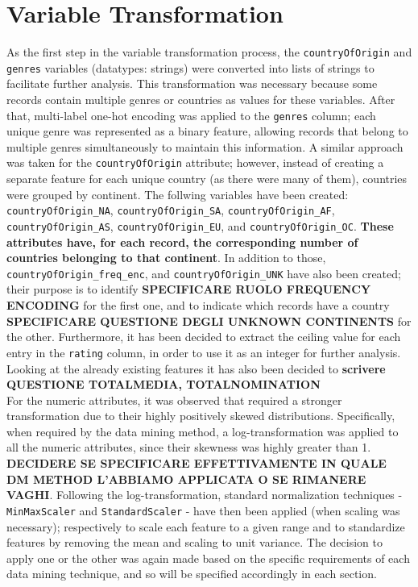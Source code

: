 \section{Variable Transformation}\label{sec:var_Transformation}
As the first step in the variable transformation process, the \texttt{countryOfOrigin} and \texttt{genres} variables (datatypes: strings) were converted into lists of strings to facilitate further analysis. 
This transformation was necessary because some records contain multiple genres or countries as values for these variables.
After that, multi-label one-hot encoding was applied to the \texttt{genres} column; each unique genre was represented as a binary feature, allowing records that belong to multiple genres simultaneously to maintain this information.
A similar approach was taken for the \texttt{countryOfOrigin} attribute; however, instead of creating a separate feature for each unique country (as there were many of them), countries were grouped by continent.
The follwing variables have been created: \texttt{countryOfOrigin\_NA}, \texttt{countryOfOrigin\_SA}, \texttt{countryOfOrigin\_AF}, \texttt{countryOfOrigin\_AS}, \texttt{countryOfOrigin\_EU}, and \texttt{countryOfOrigin\_OC}. 
\textbf{These attributes have, for each record, the corresponding number of countries belonging to that continent}.
In addition to those, \texttt{countryOfOrigin\_freq\_enc}, and \texttt{countryOfOrigin\_UNK} have also been created; their purpose is to identify \textbf{SPECIFICARE RUOLO FREQUENCY ENCODING} for the first one, and to indicate which records have a country \textbf{SPECIFICARE QUESTIONE DEGLI UNKNOWN CONTINENTS} for the other. 
Furthermore, it has been decided to extract the ceiling value for each entry in the \texttt{rating} column, in order to use it as an integer for further analysis.
Looking at the already existing features it has also been decided to \textbf{scrivere QUESTIONE TOTALMEDIA, TOTALNOMINATION}\\

For the numeric attributes, it was observed that required a stronger transformation due to their highly positively skewed distributions. 
Specifically, when required by the data mining method, a log-transformation was applied to all the numeric attributes, since their skewness was highly greater than 1. 
\textbf{DECIDERE SE SPECIFICARE EFFETTIVAMENTE IN QUALE DM METHOD L'ABBIAMO APPLICATA O SE RIMANERE VAGHI}.
Following the log-transformation, standard normalization techniques - \texttt{MinMaxScaler} and \texttt{StandardScaler} - have then been applied (when scaling was necessary); respectively to scale each feature to a given range and to standardize features by removing the mean and scaling to unit variance.
The decision to apply one or the other was again made based on the specific requirements of each data mining technique, and so will be specified accordingly in each section.

